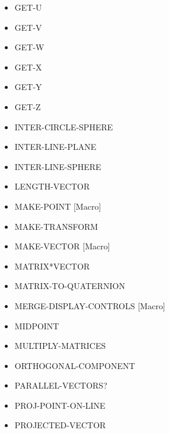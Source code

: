 \documentclass [11pt]{book}
\begin{document}
\begin{itemize}
\item {}GET-U

\item {}GET-V

\item {}GET-W

\item {}GET-X

\item {}GET-Y

\item {}GET-Z

\item {}INTER-CIRCLE-SPHERE

\item {}INTER-LINE-PLANE

\item {}INTER-LINE-SPHERE

\item {}LENGTH-VECTOR

\item {}MAKE-POINT [Macro]

\item {}MAKE-TRANSFORM

\item {}MAKE-VECTOR [Macro]

\item {}MATRIX*VECTOR

\item {}MATRIX-TO-QUATERNION

\item {}MERGE-DISPLAY-CONTROLS [Macro]

\item {}MIDPOINT

\item {}MULTIPLY-MATRICES

\item {}ORTHOGONAL-COMPONENT

\item {}PARALLEL-VECTORS?

\item {}PROJ-POINT-ON-LINE

\item {}PROJECTED-VECTOR


\end{itemize}
\end{document}
